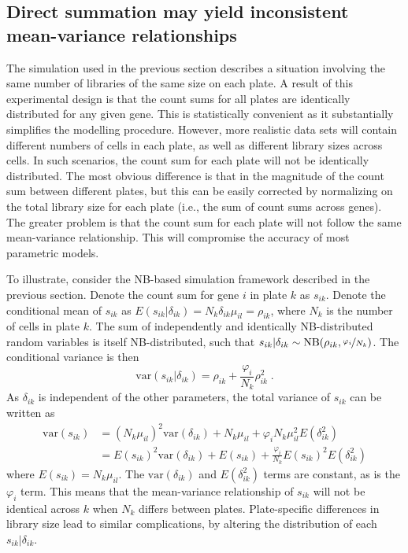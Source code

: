 \documentclass{article}
\begin{document}
\subsection{Direct summation may yield inconsistent mean-variance relationships}
The simulation used in the previous section describes a situation involving the same number of libraries of the same size on each plate.
A result of this experimental design is that the count sums for all plates are identically distributed for any given gene.
This is statistically convenient as it substantially simplifies the modelling procedure.
However, more realistic data sets will contain different numbers of cells in each plate, as well as different library sizes across cells.
In such scenarios, the count sum for each plate will not be identically distributed.
The most obvious difference is that in the magnitude of the count sum between different plates, 
    but this can be easily corrected by normalizing on the total library size for each plate (i.e., the sum of count sums across genes).
The greater problem is that the count sum for each plate will not follow the same mean-variance relationship.
This will compromise the accuracy of most parametric models.

To illustrate, consider the NB-based simulation framework described in the previous section.
Denote the count sum for gene $i$ in plate $k$ as $s_{ik}$.
Denote the conditional mean of $s_{ik}$ as $E(s_{ik}|\delta_{ik})=N_k \delta_{ik}\mu_{il} = \rho_{ik}$, where $N_k$ is the number of cells in plate $k$.
The sum of independently and identically NB-distributed random variables is itself NB-distributed, 
    such that $s_{ik} |\delta_{ik} \sim \mbox{NB}(\rho_{ik}, \nicefrac{\varphi_i}{N_k})$.
The conditional variance is then
\[
    \mbox{var}(s_{ik} |\delta_{ik}) = \rho_{ik} + \frac{\varphi_i}{N_k}\rho_{ik}^2 \;.
\]
As $\delta_{ik}$ is independent of the other parameters, the total variance of $s_{ik}$ can be written as
\begin{align*}
    \mbox{var}(s_{ik}) &= (N_k\mu_{il})^2\mbox{var}(\delta_{ik}) + N_k\mu_{il} + \varphi_i N_k\mu_{il}^2 E(\delta_{ik}^2) \\
                       &= E(s_{ik})^2 \mbox{var}(\delta_{ik}) + E(s_{ik}) + \frac{\varphi_i}{N_k} E(s_{ik})^2 E(\delta_{ik}^2) 
\end{align*}
where $E(s_{ik})=N_k\mu_{il}$. 
The $\mbox{var}(\delta_{ik})$ and $E(\delta_{ik}^2)$ terms are constant, as is the $\varphi_i$ term.
This means that the mean-variance relationship of $s_{ik}$ will not be identical across $k$ when $N_k$ differs between plates.
Plate-specific differences in library size lead to similar complications, by altering the distribution of each $s_{ik} |\delta_{ik}$.
\end{document}
